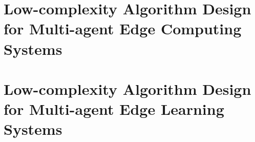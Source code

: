 \documentclass[phd,12pt]{hkuthesis}
\title{{\MyThesisTitle}}
\author{{\MyName}} %
\date{September, 2023}
\theoremstyle{definition}             %
\theoremstyle{remark}                 %
\theoremstyle{plain}                  %
\begin{document}
    \begin{frontmatter}
        \abstract[498]		%
        \titlepage
        \declaration
        \acknowledgements
        \publications
        \tableofcontents
        \listoffigures
        \listoftables
    \end{frontmatter}

    \begin{chapters}
        
        \part{Low-complexity Algorithm Design for Multi-agent Edge Computing Systems} %
        \label{part_1}
        
        
        \part{Low-complexity Algorithm Design for Multi-agent Edge Learning Systems} %
        \label{part_2}
        
        
        
    \end{chapters}

    \begin{backmatter}
        \printbibliography[heading=bibintoc,title=Bibliography]
    \end{backmatter}
\end{document}
